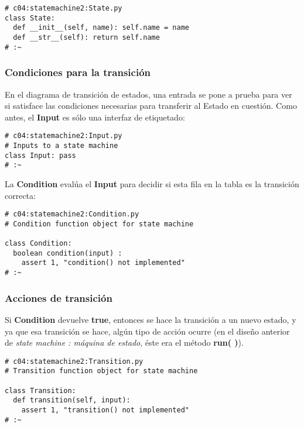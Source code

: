  \begin{lstlisting}
# c04:statemachine2:State.py 
class State: 
  def __init__(self, name): self.name = name 
  def __str__(self): return self.name  
# :~  
 \end{lstlisting}
  
  
\subsubsection*{Condiciones para la transición}
\label{subsubsec:cplt}

En el diagrama de transición de estados, una entrada se pone a prueba para ver si satisface las condiciones necesarias para transferir al Estado en cuestión. Como antes, el \textbf{Input} es sólo una interfaz de etiquetado:     \newline

\begin{lstlisting}
# c04:statemachine2:Input.py 
# Inputs to a state machine 
class Input: pass 
# :~ 
\end{lstlisting}

La \textbf{Condition} evalúa el \textbf{Input} para decidir si esta fila en la tabla es la transición correcta: \newline

  \begin{lstlisting}
# c04:statemachine2:Condition.py 
# Condition function object for state machine 

class Condition: 
  boolean condition(input) :  
    assert 1, "condition() not implemented" 
# :~ 
\end{lstlisting}


\subsubsection*{Acciones de transición}
\label{subsubsec:adt}

Si \textbf{Condition} devuelve \textbf{true}, entonces se hace la transición a un nuevo estado, y ya que esa transición se hace, algún tipo de acción ocurre (en el diseño anterior de \textit{state machine : máquina de estado}, éste era el método \textbf{run( )}).     \newline

\begin{lstlisting}
# c04:statemachine2:Transition.py 
# Transition function object for state machine 

class Transition: 
  def transition(self, input): 
    assert 1, "transition() not implemented" 
# :~ 
\end{lstlisting}

